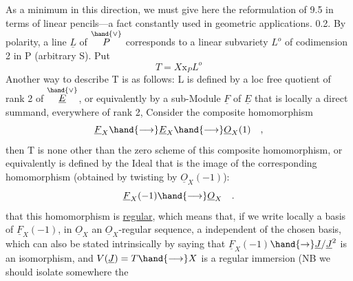 
As a minimum in this direction, we must give here the reformulation of 9.5
in terms of linear pencils—a fact constantly used in geometric
applications.
0.2. By polarity, a line $\underline{L}$ of $\overset{\hand{\vee}}{P}$ corresponds to a linear
subvariety $L^{o}$ of codimension 2 in P (arbitrary S). Put
\[ T = X\mathrm{x}_{P}L^{o} \]
Another way to describe T is as follows: L is defined by a
loc free quotient of rank 2 of $\overset{\hand{\vee}}{\underline{E}}$, or equivalently by a
sub-Module $\underline{F}$ of $\underline{E}$ that is locally a direct summand, everywhere of rank 2,
Consider the composite homomorphism
\[ \underline{F}_{X} \hand{\longrightarrow} \underline{E}_{X} \hand{\longrightarrow} \underline{O}_{X}(1) \quad , \]
then T is none other than the zero scheme of this composite
homomorphism, or equivalently is defined by the Ideal  that is the image of the corresponding
homomorphism (obtained by twisting by $\underline{O}_{X}(-1)$):
\[ \underline{F}_{X}(-1) \hand{\longrightarrow} \underline{O}_{X} \quad . \]
 that this homomorphism is \uline{regular}, which means
that, if we write locally a  basis of $\underline{F}_{X}(-1)$,    in $\underline{O}_{X}$\hand{\unsure{$\curvearrowleft$|$\widehat{\ }$}}
 an $\underline{O}_{X}$-regular sequence, a  independent of the
chosen basis, which can also be stated intrinsically by saying that
$\underline{F}_{X}(-1)$$\hand{\to} \underline{J}/\underline{J}^{2}$ is an isomorphism, and $V(\underline{J})=T \hand{\longrightarrow} X$ is a regular
 immersion (NB we  should isolate somewhere the
